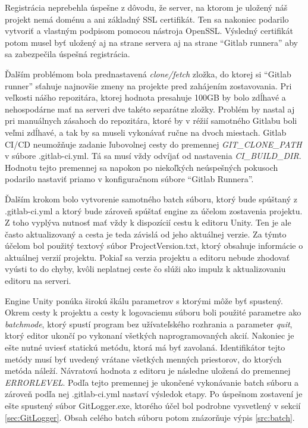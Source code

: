 \documentclass[slovak, bachelorpractice]{diploma}
\begin{document}
Registrácia neprebehla úspešne z dôvodu, že server, na ktorom je uložený náš projekt nemá doménu a ani základný SSL certifikát. Ten sa nakoniec podarilo vytvoriť a vlastným podpisom pomocou nástroja OpenSSL. Výsledný certifikát potom musel byť uložený aj na strane servera aj na strane \enquote{Gitlab runnera} aby sa  zabezpečila úspešná registrácia.

Ďalším problémom bola prednastavená \textit{clone/fetch} zložka, do ktorej si \enquote{Gitlab runner} sťahuje najnovšie zmeny na projekte pred zahájením zostavovania. Pri veľkosti nášho repozitára, ktorej hodnota presahuje 100GB by bolo zdĺhavé a nehospodárne mať na serveri dve takéto separátne zložky. Problém by nastal aj pri manuálnych zásahoch do repozitára, ktoré by v réžií samotného Gitlabu boli veľmi zdĺhavé, a tak by sa museli vykonávať ručne na dvoch miestach. Gitlab CI/CD neumožňuje zadanie ľubovolnej cesty do premennej \textit{GIT\_CLONE\_PATH} v súbore .gitlab-ci.yml. Tá sa musí vždy odvíjať od nastavenia \textit{CI\_BUILD\_DIR}. Hodnotu tejto premennej sa napokon po niekoľkých neúspešných pokusoch podarilo nastaviť priamo v konfiguračnom súbore \enquote{Gitlab Runnera}.

Ďalším krokom bolo vytvorenie samotného batch súboru, ktorý bude spúštaný z .gitlab-ci.yml a ktorý bude zároveň spúštať engine za účelom zostavenia projektu. Z toho vyplýva nutnosť mať vždy k dispozícií cestu k editoru Unity. Ten je ale často aktualizovaný a cesta je teda závislá od jeho aktuálnej verzie. Za týmto účelom bol použitý textový súbor ProjectVersion.txt, ktorý obsahuje informácie o aktuálnej verzií projektu. Pokiaľ sa verzia projektu a editoru nebude zhodovať vyústi to do chyby, kvôli neplatnej ceste čo slúži ako impulz k aktualizovaniu editoru na serveri.

Engine Unity ponúka širokú škálu parametrov s ktorými môže byť spustený. Okrem cesty k projektu a cesty k logovaciemu súboru boli použité parametre ako \textit{batchmode}, ktorý spustí program bez užívateľského rozhrania a parameter \textit{quit}, ktorý editor ukončí po vykonaní všetkých naprogramovaných akcií. Nakoniec je ešte nutné uviesť statickú metódu, ktorá má byť zavolaná. Identifikátor tejto metódy musí byť uvedený vrátane všetkých menných priestorov, do ktorých metóda náleží. Návratová hodnota z editoru je následne uložená do premennej \textit{ERRORLEVEL}. Podľa tejto premennej je ukončené vykonávanie batch súboru a zároveň podľa nej .gitlab-ci.yml nastaví výsledok etapy. Po úspešnom zostavení je ešte spustený súbor GitLogger.exe, ktorého účel bol podrobne vysvetlený v sekcií \ref{sec:GitLogger}. Obsah celého batch súboru potom znázorňuje výpis \ref{src:batch}.
\end{document}
